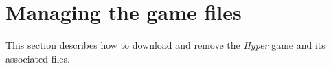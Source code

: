 \section{Managing the game files}
This section describes how to download and remove the \textit{Hyper} game and its associated files.


